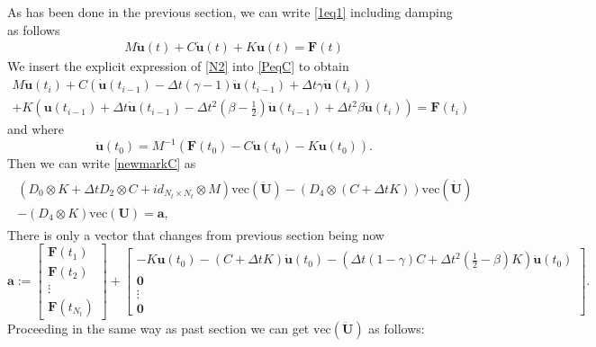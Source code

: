 \documentclass{ws-m3as}
\begin{document}
As has been done in the previous section, we can write \eqref{1eq1} including damping as follows
\begin{align}
M \ddot{\mathbf{u}}(t) + C \dot{\mathbf{u}}(t)  + K \mathbf{u}(t) = \mathbf{F}(t) \label{PeqC}
\end{align}
We insert the explicit expression of \eqref{N2} into \eqref{PeqC} to obtain
\begin{align}
 M \ddot{\mathbf{u}}(t_{i})  + C \left(\dot{\mathbf{u}}(t_{i-1})
- \Delta t \left( \gamma -1\right)\ddot{\mathbf{u}}(t_{i-1}) + \Delta t \gamma \ddot{\mathbf{u}}(t_{i}) \right) \\
+ K \left(\mathbf{u}(t_{i-1}) + \Delta t \dot{\mathbf{u}}(t_{i-1})
- \Delta t^2 \left( \beta -\frac{1}{2}\right)\ddot{\mathbf{u}}(t_{i-1}) + \Delta t^2 \beta \ddot{\mathbf{u}}(t_{i}) \right)   = \mathbf{F}(t_{i})\label{newmarkC}
\end{align}
and where
$$
\ddot{\mathbf{u}}(t_0) = M^{-1}\left( \mathbf{F}(t_0) - C \dot{\mathbf{u}}(t_0) - K \mathbf{u}(t_0) \right).
$$
Then we can write \ref{newmarkC} as
\begin{align}
\begin{array}{c}
\left(D_0 \otimes K + \Delta t D_2 \otimes C + id_{N_t \times N_t} \otimes  M  \right) \mathrm{vec}(\ddot{\mathbf{U}}) - \left(D_4 \otimes  \left(C+\Delta t K\right)\right)\mathrm{vec}(\dot{\mathbf{U}}) \\
- \left( D_4 \otimes   K\right)\mathrm{vec}(\mathbf{U}) =
\mathbf{a},
\end{array}\label{newmark13}
\end{align}
There is only a vector that changes from previous section being now
$$
\mathbf{a}:= \left[
\begin{array}{c}
\mathbf{F}(t_1)\\
\mathbf{F}(t_2) \\
\vdots \\
\mathbf{F}(t_{N_t}) 
\end{array}
\right] + 
\left[
\begin{array}{c}
-  K  \mathbf{u}(t_0) - \left( C + \Delta t K \right) \dot{\mathbf{u}}(t_0) - \left( \Delta t \left(1 - \gamma \right) C + \Delta t^2 \left( \frac{1}{2}-\beta \right) K \right)\ddot{\mathbf{u}}(t_0)\\
\mathbf{0} \\
\vdots \\
\mathbf{0} 
\end{array}
\right].
$$
Proceeding in the same way as past section we can get $\mathrm{vec}(\ddot{\mathbf{U}})$ as follows:
\end{document}
